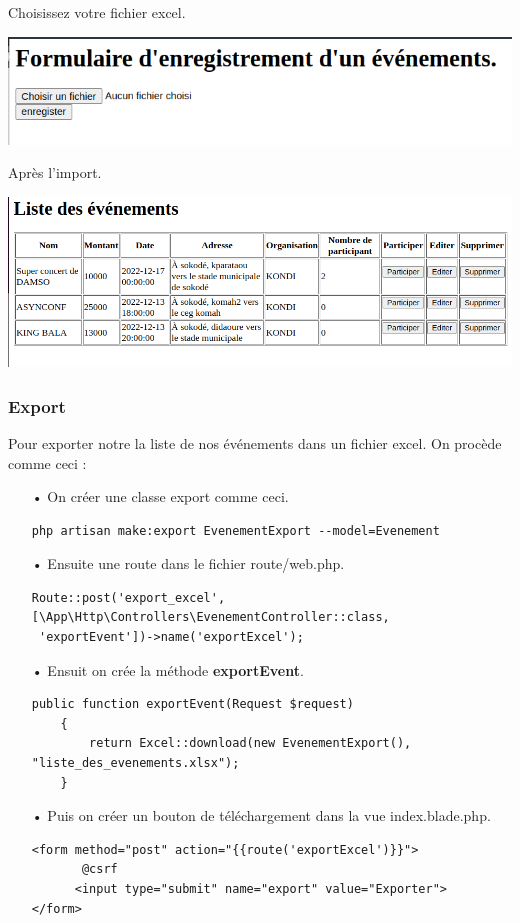 \documentclass[12pt,a4paper]{article}
\begin{document}
Choisissez votre fichier excel.
\begin{center}
\includegraphics[scale=0.6]{img/import_form.png}
\end{center}
Après l'import.
\begin{center}
\includegraphics[scale=0.55]{img/import.png}
\end{center}

\subsubsection{Export}
Pour exporter notre la liste de nos événements dans un fichier excel. On procède comme
ceci : 
\begin{itemize}
\item[•] On créer une classe export comme ceci.
\begin{verbatim}
php artisan make:export EvenementExport --model=Evenement
\end{verbatim}
\item[•] Ensuite une route dans le fichier route/web.php.
\begin{verbatim}
Route::post('export_excel', [\App\Http\Controllers\EvenementController::class,
 'exportEvent'])->name('exportExcel');
\end{verbatim}
\item[•] Ensuit on crée la méthode \textbf{exportEvent}.
\begin{verbatim}
public function exportEvent(Request $request)
    {
        return Excel::download(new EvenementExport(), "liste_des_evenements.xlsx");
    }
\end{verbatim}
\item[•] Puis on créer un bouton de téléchargement dans la vue index.blade.php.
\begin{verbatim}
<form method="post" action="{{route('exportExcel')}}">
       @csrf
      <input type="submit" name="export" value="Exporter">
</form>
\end{verbatim}
\end{itemize}
\end{document}
